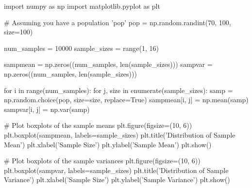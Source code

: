 \documentclass[12pt,a4paper]{article}
\theoremstyle{example}
\theoremstyle{definition}
\theoremstyle{theorem}
\begin{document}
 \pagebreak 
 \begin{python}
import numpy as np
import matplotlib.pyplot as plt

# Assuming you have a population 'pop'
pop = np.random.randint(70, 100, size=100)

num_samples = 10000
sample_sizes = range(1, 16)

sampmean = np.zeros((num_samples, len(sample_sizes)))
sampvar = np.zeros((num_samples, len(sample_sizes)))

for i in range(num_samples):
    for j, size in enumerate(sample_sizes):
        samp = np.random.choice(pop, size=size, replace=True)
        sampmean[i, j] = np.mean(samp)
        sampvar[i, j] = np.var(samp)

# Plot boxplots of the sample means
plt.figure(figsize=(10, 6))
plt.boxplot(sampmean, labels=sample_sizes)
plt.title('Distribution of Sample Mean')
plt.xlabel('Sample Size')
plt.ylabel('Sample Mean')
plt.show()

# Plot boxplots of the sample variances
plt.figure(figsize=(10, 6))
plt.boxplot(sampvar, labels=sample_sizes)
plt.title('Distribution of Sample Variance')
plt.xlabel('Sample Size')
plt.ylabel('Sample Variance')
plt.show()

 \end{python}
\end{document}
